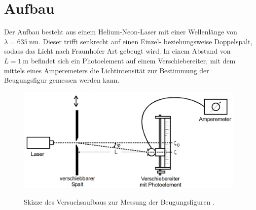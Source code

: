 \section{Aufbau}
\label{sec:Aufbau}

Der Aufbau besteht aus einem Helium-Neon-Laser mit einer Wellenlänge von $\lambda = \SI{635}{\nano\metre}$. Dieser trifft senkrecht auf einen Einzel- beziehungsweise Doppelspalt, sodass das Licht nach Fraunhofer Art gebeugt wird. In einem Abstand von $L=\SI{1}{\metre}$ befindet sich ein Photoelement auf einem Verschiebereiter, mit dem mittels eines Amperemeters die Lichtintensität zur Bestimmung der Beugungsfigur gemessen werden kann.

\begin{figure}
	\centering
	\caption{Skizze des Versuchsaufbaus zur Messung der Beugungsfiguren \cite{V406}.}
	\includegraphics[width=\linewidth-70pt,height=\textheight-70pt,keepaspectratio]{content/images/Aufbau.png}
	\label{fig:Aufbau}
\end{figure}